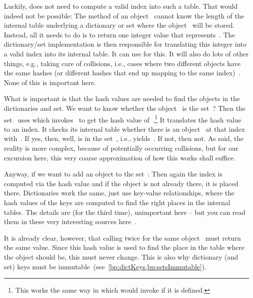 Luckily,  does not need to compute a valid index into such a table.
That would indeed not be possible:
The  method of an object~ cannot know the length of the internal table underlying a dictionary or set where the object~ will be stored.
Instead, all it needs to do is to return one integer value that represents~.
The dictionary/set implementation is then responsible for translating this integer into a valid index into its internal table.
It can use  for this.
It will also do lots of other things, e.g., taking care of collisions, i.e., cases where two different objects have the same hashes (or different hashes that end up mapping to the same index)~\cite{G2020PHTUTH,L2011PDI}.
None of this is important here.

What is important is that the hash values are needed to find the objects in the dictionaries and set.
We want to know whether the object~ is  the set~?
Then the set~ uses  which invokes~ to get the hash value of~.\footnote{%
This works the same way in which  would invoke  if it is defined.}
It translates the hash value to an index.
It checks its internal table whether there is an object~ at that index with~.
If yes, then, well,  is in the set~, i.e.,  yields~.
If not, then not.
As said, the reality is more complex, because of potentially occurring collisions, but for our excursion here, this very coarse approximation of how this works shall suffice.

Anyway, if we want to add an object to the set~:
Then again the index is computed via the hash value and if the object is not already there, it is placed there.
Dictionaries work the same, just use key-value relationships, where the hash values of the keys are computed to find the right places in the internal tables.
The details are (for the third time), unimportant here -- but you can read them in these very interesting sources here~\cite{G2020PHTUTH,L2011PDI}.

It is already clear, however, that calling  twice for the same object~ must return the same value.
Since this hash value is used to find the place in the table where the object should be, this must never change.
This is also why dictionary (and set) keys must be immutable~(see~\cref{bp:dictKeys,bp:setsImmutable}).


